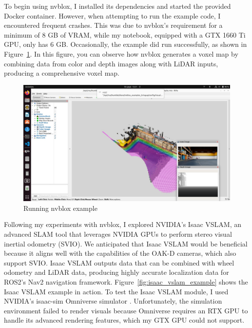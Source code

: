 To begin using nvblox, I installed its dependencies and started the provided Docker container. However, when attempting to run the example code, I encountered frequent crashes. This was due to nvblox’s requirement for a minimum of 8 GB of VRAM, while my notebook, equipped with a GTX 1660 Ti GPU, only has 6 GB. Occasionally, the example did run successfully, as shown in Figure~\ref{fig:nvblox_example}. In this figure, you can observe how nvblox generates a voxel map by combining data from color and depth images along with LiDAR inputs, producing a comprehensive voxel map.

\begin{figure}[htbp]
	\centering
	\includegraphics[width=150mm, keepaspectratio]{figures_jpg/nvblox.jpg}
	\caption{Running nvblox example}
	\label{fig:nvblox_example}
\end{figure}

Following my experiments with nvblox, I explored NVIDIA's Isaac VSLAM, an advanced SLAM tool that leverages NVIDIA GPUs to perform stereo visual inertial odometry (SVIO). We anticipated that Isaac VSLAM would be beneficial because it aligns well with the capabilities of the OAK-D cameras, which also support SVIO. Isaac VSLAM outputs data that can be combined with wheel odometry and LiDAR data, producing highly accurate localization data for ROS2's Nav2 navigation framework. Figure~\ref{fig:isaac_vslam_example} shows the Isaac VSLAM example in action. To test the Isaac VSLAM module, I used NVIDIA's isaac-sim Omniverse simulator \cite{isaac_sim_docs}. Unfortunately, the simulation environment failed to render visuals because Omniverse requires an RTX GPU to handle its advanced rendering features, which my GTX GPU could not support.

